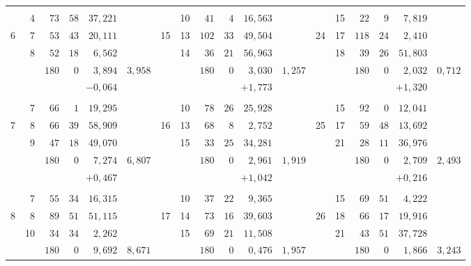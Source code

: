 \begin{center}
\begin{tabular}{|r|r|r@{\;}r@{\;}r|r||r|r|r@{\;}r@{\;}r|r||r|r|r@{\;}r@{\;}r|r|}
 &  &  &  &  &  &  &  &  &  &  &  &  &  &  &  &  & \\
 & 4 & $73$ & $58$ & $37{,}221$ &  &  & 10 & $41$ & $4$ & $16{,}563$ &  &  & 15 & $22$ & $9$ & $7{,}819$ & \\
6 & 7 & $53$ & $43$ & $20{,}111$ &  & 15 & 13 & $102$ & $33$ & $49{,}504$ &  & 24 & 17 & $118$ & $24$ & $2{,}410$ & \\
 & 8 & $52$ & $18$ & $6{,}562$ &  &  & 14 & $36$ & $21$ & $56{,}963$ &  &  & 18 & $39$ & $26$ & $51{,}803$ & \\
\cline{3-5}\cline{9-11}\cline{15-17}
 &  & $180$ & $0$ & $3{,}894$ & $3{,}958$ &  &  & $180$ & $0$ & $3{,}030$ & $1{,}257$ &  &  & $180$ & $0$ & $2{,}032$ & $0{,}712$\\
 &  & \multicolumn{3}{r|}{$-0{,}064$} &  &  &  & \multicolumn{3}{r|}{$+1{,}773$} &  &  &  & \multicolumn{3}{r|}{$+1{,}320$} & \\
 &  &  &  &  &  &  &  &  &  &  &  &  &  &  &  &  & \\
 & 7 & $66$ & $1$ & $19{,}295$ &  &  & 10 & $78$ & $26$ & $25{,}928$ &  &  & 15 & $92$ & $0$ & $12{,}041$ & \\
7 & 8 & $66$ & $39$ & $58{,}909$ &  & 16 & 13 & $68$ & $8$ & $2{,}752$ &  & 25 & 17 & $59$ & $48$ & $13{,}692$ & \\
 & 9 & $47$ & $18$ & $49{,}070$ &  &  & 15 & $33$ & $25$ & $34{,}281$ &  &  & 21 & $28$ & $11$ & $36{,}976$ & \\
\cline{3-5}\cline{9-11}\cline{15-17}
 &  & $180$ & $0$ & $7{,}274$ & $6{,}807$ &  &  & $180$ & $0$ & $2{,}961$ & $1{,}919$ &  &  & $180$ & $0$ & $2{,}709$ & $2{,}493$\\
 &  & \multicolumn{3}{r|}{$+0{,}467$} &  &  &  & \multicolumn{3}{r|}{$+1{,}042$} &  &  &  & \multicolumn{3}{r|}{$+0{,}216$} & \\
 &  &  &  &  &  &  &  &  &  &  &  &  &  &  &  &  & \\
 & 7 & $55$ & $34$ & $16{,}315$ &  &  & 10 & $37$ & $22$ & $9{,}365$ &  &  & 15 & $69$ & $51$ & $4{,}222$ & \\
8 & 8 & $89$ & $51$ & $51{,}115$ &  & 17 & 14 & $73$ & $16$ & $39{,}603$ &  & 26 & 18 & $66$ & $17$ & $19{,}916$ & \\
 & 10 & $34$ & $34$ & $2{,}262$ &  &  & 15 & $69$ & $21$ & $11{,}508$ &  &  & 21 & $43$ & $51$ & $37{,}728$ & \\
\cline{3-5}\cline{9-11}\cline{15-17}
 & \llap{\raisebox{.5ex}{.}\hspace{.4em}} & $180$ & $0$ & $9{,}692$ & $8{,}671$ &  &  & $180$ & $0$ & $0{,}476$ & $1{,}957$ &  &  & $180$ & $0$ & $1{,}866$ & $3{,}243$\\

\end{tabular}
\end{center}
